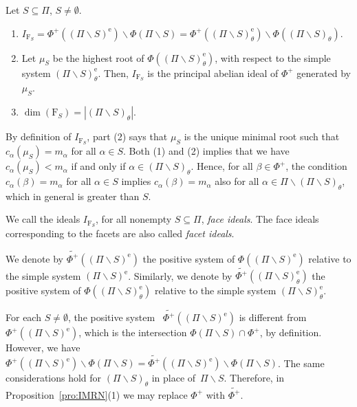 \documentclass[ALCO,published]{cedram}
\theoremstyle{plain}
\newcommand\wt{\widetilde}
\newcommand\smeno{\smallsetminus}
\newcommand\al{\alpha}
\newcommand\be{\beta}
\newcommand\erm{{\mathrm{e}}}
\begin{document}
\begin{pro} [\cite{CM1}] \label{pro:IMRN}
Let $S\subseteq \Pi$, $S\neq\emptyset$.
\begin{enumerate}
\item\label{IMRN-1}
$I_{\mathrm F_S}=\Phi^+((\Pi\smeno S)^\erm)\smeno \Phi(\Pi\smeno S)=\Phi^+((\Pi\smeno S)^\erm_\theta)\smeno \Phi((\Pi\smeno S)_\theta)$. 
\label{itm:ideale}
\item
Let $\mu_S$ be the highest root of $\Phi((\Pi\smeno S)^\erm_\theta)$, with respect to the simple system  $(\Pi\smeno S)^\erm_\theta$. Then,
$I_{\mathrm F_S}$  is the principal abelian ideal of $\Phi^+$ generated by $\mu_S$.
\label{itm:principale}
\item
$\dim(\mathrm F_S)=|(\Pi\smeno S)_\theta|$.
\label{itm:dimensione}
\end{enumerate}
\end{pro}

By definition of $I_{\mathrm F_S}$, part (2)  says that $\mu_S$ is the unique minimal root  such that $c_\al(\mu_S)=m_\al$ for all $\al\in S$.
Both (1) and (2) implies that  we have $c_\al(\mu_S)<m_\al$ if and only if $\al\in (\Pi\smeno S)_\theta$. 
Hence, for all $\be\in \Phi^+$, the condition $c_\al(\be)=m_\al$ for all $\al\in S$ implies $c_\al(\be)=m_\al$ also for all  $\al\in \Pi\smeno (\Pi \smeno S)_\theta$, which in general is greater than $S$. 

\begin{defi}
We call the ideals $I_{\mathrm F_S}$, for all nonempty $S\subseteq \Pi$, {\it face ideals}.
The face ideals corresponding to the facets are also called {\it facet ideals}.
\end{defi}

\begin{defi}\label{def:phi-piu-tilde}
We denote by $\wt{\Phi^+}((\Pi \smeno S)^\erm)$ the positive system of $\Phi((\Pi \smeno S)^\erm)$ relative to  the simple system $(\Pi \smeno S)^\erm$.
Similarly, we denote by $\wt{\Phi^+}((\Pi \smeno S)^\erm_\theta)$ the positive system of $\Phi((\Pi \smeno S)^\erm_\theta)$ relative to  the simple system $(\Pi \smeno S)^\erm_\theta$.
\end{defi}

\begin{rem}\label{rem:proIMRN}
For each $S\neq \emptyset$, the positive system \ $\wt{\Phi^+}((\Pi \smeno S)^\erm)$ is different from $\Phi^+((\Pi \smeno S)^\erm)$, which  is the intersection $\Phi(\Pi \smeno S)\cap \Phi^+$, by definition.  
However, we have $\Phi^+((\Pi \smeno S)^\erm)\smeno \Phi(\Pi \smeno S)=\wt{\Phi^+}((\Pi \smeno S)^\erm)\smeno \Phi(\Pi \smeno S)$. 
The same considerations hold for $(\Pi \smeno S)_\theta$ in place of~$\Pi \smeno S$. 
Therefore, in Proposition~\ref{pro:IMRN}(1) we may replace  $\Phi^+$ with  $\wt {\Phi^+}$.
\end{rem}
\end{document}
